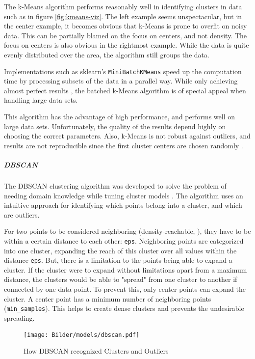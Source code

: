 		The k-Means algorithm performs reasonably well in identifying clusters in data such as in figure \ref{fig:kmeans-viz}. The left example seems unspectacular, but in the center example, it becomes obvious that k-Means is prone to overfit on noisy data. This can be partially blamed on the focus on centers, and not density. The focus on centers is also obvious in the rightmost example. While the data is quite evenly distributed over the area, the algorithm still groups the data. 
		
		Implementations such as \ac{sklearn}'s \lstinline|MiniBatchKMeans| \cite{sklearn} speed up the computation time by processing subsets of the data in a parallel way. While only achieving almost perfect results \cite{sculleyWebscaleKmeansClustering2010}, the batched k-Means algorithm is of special appeal when handling large data sets.
		
		This algorithm has the advantage of high performance, and performs well on large data sets. Unfortunately, the quality of the results depend highly on choosing the correct parameters. Also, k-Means is not robust against outliers, and results are not reproducible since the first cluster centers are chosen randomly \cite[c.6.2]{40algorithms}.
		
		\subparagraph{\acl{DBSCAN}}
		The \ac{DBSCAN} clustering algorithm was developed to solve the problem of needing domain knowledge while tuning cluster models \cite{DBSCAN}. The algorithm uses an intuitive approach for identifying which points belong into a cluster, and which are outliers.

		For two points to be considered neighboring (density-reachable, \cite{DBSCAN}), they have to be within a certain distance to each other: \lstinline|eps|. Neighboring points are categorized into one cluster, expanding the reach of this cluster over all values within the distance \lstinline|eps|.
		But, there is a limitation to the points being able to expand a cluster. If the cluster were to expand without limitations apart from a maximum distance, the clusters would be able to "spread" from one cluster to another if connected by one data point.
		To prevent this, only center points can expand the cluster. A center point has a minimum number of neighboring points (\lstinline|min_samples|). This helps to create dense clusters and prevents the undesirable spreading.
		
		 \begin{figure}[!h]
			\centering
			\texttt{[image: Bilder/models/dbscan.pdf]}
			\caption[How DBSCAN recognized Clusters and Outliers]{How DBSCAN recognized Clusters and Outliers \cite{sklearn}}
			\label{fig:dbscan-viz}
		\end{figure}
	
